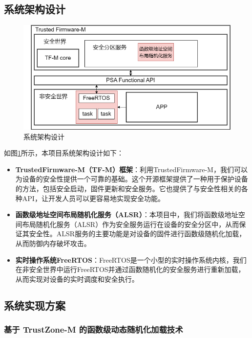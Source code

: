 \documentclass[12pt,a4paper]{ctexart}
\numberwithin{figure}{section}
\begin{document}
\subsection{系统架构设计}
\begin{figure}[H]
    \centering
    \includegraphics[scale=0.5]{graph/picture of all works.png}
    \caption{系统架构设计}
    \label{fig:system_architecture}
\end{figure}
\par 如图\ref{fig:system_architecture}所示，本项目系统架构设计如下：

\begin{itemize}
    \item \textbf{TrustedFirmware-M（TF-M）框架}：利用TrustedFirmware-M，我们可以为设备的安全性提供一个可靠的基础。这个开源框架提供了一种用于保护设备的方法，包括安全启动，固件更新和安全服务。它也提供了与安全性相关的各种API，让开发人员可以更容易地实现安全功能。
    \item \textbf{函数级地址空间布局随机化服务（ALSR）}：本项目中，我们将函数级地址空间布局随机化服务（ALSR）作为安全服务运行在设备的安全分区中，从而保证其安全性。ALSR服务的主要功能是对设备的固件进行函数级随机化加载，从而防御内存破坏攻击。
    \item \textbf{实时操作系统FreeRTOS}：FreeRTOS是一个小型的实时操作系统内核，我们在非安全世界中运行FreeRTOS并通过函数随机化的安全服务进行重新加载，从而实现对设备的实时调度和安全执行。
\end{itemize}

\subsection{系统实现方案}

\subsubsection{基于 TrustZone-M 的函数级动态随机化加载技术}
\end{document}
